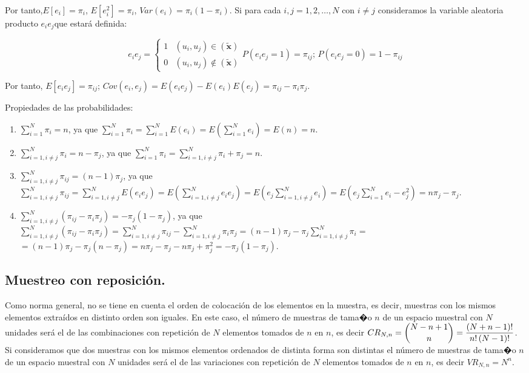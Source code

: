 Por tanto,$E\left[e_{i}\right]=\pi_{i}$, $E\left[e_{i}^{2}\right]=\pi_{i}$,
$Var\left(e_{i}\right)=\pi_{i}\left(1-\pi_{i}\right)$. Si para cada
$i,j=1,2,\ldots,N$ con $i\neq j$ consideramos la variable aleatoria
producto $e_{i}e_{j}$que estar\'a definida:

\[
e_{i}e_{j}=\begin{cases}
1 & \left(u_{i},u_{j}\right)\in\left(\widetilde{\boldsymbol{x}}\right)\\
0 & \left(u_{i},u_{j}\right)\notin\left(\widetilde{\boldsymbol{x}}\right)
\end{cases}P\left(e_{i}e_{j}=1\right)=\pi_{ij};\,P\left(e_{i}e_{j}=0\right)=1-\pi_{ij}
\]


Por tanto, $E\left[e_{i}e_{j}\right]=\pi_{ij}$; $Cov\left(e_{i},e_{j}\right)=E\left(e_{i}e_{j}\right)-E\left(e_{i}\right)E\left(e_{j}\right)=\pi_{ij}-\pi_{i}\pi_{j}$.

Propiedades de las probabilidades:
\begin{enumerate}
\item $\sum_{i=1}^{N}\pi_{i}=n$, ya que $\sum_{i=1}^{N}\pi_{i}=\sum_{i=1}^{N}E\left(e_{i}\right)=E\left(\sum_{i=1}^{N}e_{i}\right)=E\left(n\right)=n$.
\item $\sum_{i=1,i\neq j}^{N}\pi_{i}=n-\pi_{j}$, ya que $\sum_{i=1}^{N}\pi_{i}=\sum_{i=1,i\neq j}^{N}\pi_{i}+\pi_{j}=n$.
\item $\sum_{i=1,i\neq j}^{N}\pi_{ij}=\left(n-1\right)\pi_{j}$, ya que
$\sum_{i=1,i\neq j}^{N}\pi_{ij}=\sum_{i=1,i\neq j}^{N}E\left(e_{i}e_{j}\right)=E\left(\sum_{i=1,i\neq j}^{N}e_{i}e_{j}\right)=E\left(e_{j}\sum_{i=1,i\neq j}^{N}e_{i}\right)=E\left(e_{j}\sum_{i=1}^{N}e_{i}-e_{j}^{2}\right)=n\pi_{j}-\pi_{j}$.
\item $\sum_{i=1,i\neq j}^{N}\left(\pi_{ij}-\pi_{i}\pi_{j}\right)=-\pi_{j}\left(1-\pi_{j}\right)$,
ya que $\sum_{i=1,i\neq j}^{N}\left(\pi_{ij}-\pi_{i}\pi_{j}\right)=\sum_{i=1,i\neq j}^{N}\pi_{ij}-\sum_{i=1,i\neq j}^{N}\pi_{i}\pi_{j}=\left(n-1\right)\pi_{j}-\pi_{j}\sum_{i=1,i\neq j}^{N}\pi_{i}=$
$=\left(n-1\right)\pi_{j}-\pi_{j}\left(n-\pi_{j}\right)=n\pi_{j}-\pi_{j}-n\pi_{j}+\pi_{j}^{2}=-\pi_{j}\left(1-\pi_{j}\right)$.
\end{enumerate}

\subsection{Muestreo con reposici\'on.}

Como norma general, no se tiene en cuenta el orden de colocaci\'on de
los elementos en la muestra, es decir, muestras con los mismos elementos
extra\'idos en distinto orden son iguales. En este caso, el n\'umero de
muestras de tama�o $n$ de un espacio muestral con $N$ unidades ser\'a
el de las combinaciones con repetici\'on de $N$ elementos tomados de
$n$ en $n$, es decir $CR_{N,n}=\dbinom{N-n+1}{n}=\dfrac{\left(N+n-1\right)!}{n!\left(N-1\right)!}$.
Si consideramos que dos muestras con los mismos elementos ordenados
de distinta forma son distintas el n\'umero de muestras de tama�o $n$
de un espacio muestral con $N$ unidades ser\'a el de las variaciones
con repetici\'on de $N$ elementos tomados de $n$ en $n$, es decir
$VR_{N,n}=N^{n}$.

